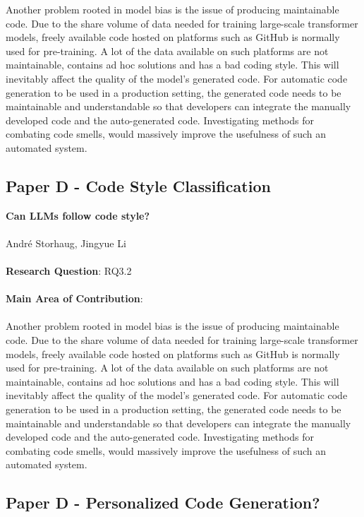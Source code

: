 \documentclass[12pt]{book}
\begin{document}
Another problem rooted in model bias is the issue of producing maintainable code. Due to the share volume of data needed for training large-scale transformer models, freely available code hosted on platforms such as GitHub is normally used for pre-training. A lot of the data available on such platforms are not maintainable, contains ad hoc solutions and has a bad coding style. This will inevitably affect the quality of the model's generated code. For automatic code generation to be used in a production setting, the generated code needs to be maintainable and understandable so that developers can integrate the manually developed code and the auto-generated code. Investigating methods for combating code smells, would massively improve the usefulness of such an automated system.

\subsection{Paper D - Code Style Classification}

\textbf{Can LLMs follow code style?}\\\\
\noindent Andr\'e Storhaug, Jingyue Li\\\\
\noindent \textbf{Research Question}: RQ3.2\\\\
\noindent \textbf{Main Area of Contribution}: \\\\

Another problem rooted in model bias is the issue of producing maintainable code. Due to the share volume of data needed for training large-scale transformer models, freely available code hosted on platforms such as GitHub is normally used for pre-training. A lot of the data available on such platforms are not maintainable, contains ad hoc solutions and has a bad coding style. This will inevitably affect the quality of the model's generated code. For automatic code generation to be used in a production setting, the generated code needs to be maintainable and understandable so that developers can integrate the manually developed code and the auto-generated code. Investigating methods for combating code smells, would massively improve the usefulness of such an automated system.



\subsection{Paper D - Personalized Code Generation?}
\end{document}
